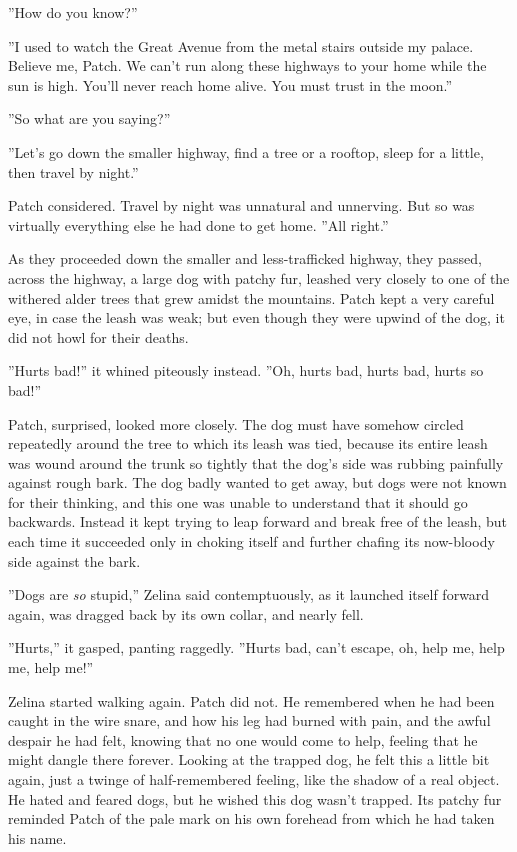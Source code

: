 \documentclass[12pt]{book}
\begin{document}
''How do you know?''

''I used to watch the Great Avenue from the metal stairs outside my palace. Believe me, Patch. We can't run along these highways to your home while the sun is high. You'll never reach home alive. You must trust in the moon.''

''So what are you saying?''

''Let's go down the smaller highway, find a tree or a rooftop, sleep for a little, then travel by night.''

Patch considered. Travel by night was unnatural and unnerving. But so was virtually everything else he had done to get home. ''All right.''

As they proceeded down the smaller and less-trafficked highway, they passed, across the highway, a large dog with patchy fur, leashed very closely to one of the withered alder trees that grew amidst the mountains. Patch kept a very careful eye, in case the leash was weak; but even though they were upwind of the dog, it did not howl for their deaths.

''Hurts bad!'' it whined piteously instead. ''Oh, hurts bad, hurts bad, hurts so bad!''

Patch, surprised, looked more closely. The dog must have somehow circled repeatedly around the tree to which its leash was tied, because its entire leash was wound around the trunk so tightly that the dog's side was rubbing painfully against rough bark. The dog badly wanted to get away, but dogs were not known for their thinking, and this one was unable to understand that it should go backwards. Instead it kept trying to leap forward and break free of the leash, but each time it succeeded only in choking itself and further chafing its now-bloody side against the bark.

''Dogs are {\it so} stupid,'' Zelina said contemptuously, as it launched itself forward again, was dragged back by its own collar, and nearly fell.

''Hurts,'' it gasped, panting raggedly. ''Hurts bad, can't escape, oh, help me, help me, help me!''

Zelina started walking again. Patch did not. He remembered when he had been caught in the wire snare, and how his leg had burned with pain, and the awful despair he had felt, knowing that no one would come to help, feeling that he might dangle there forever. Looking at the trapped dog, he felt this a little bit again, just a twinge of half-remembered feeling, like the shadow of a real object. He hated and feared dogs, but he wished this dog wasn't trapped. Its patchy fur reminded Patch of the pale mark on his own forehead from which he had taken his name.
\end{document}
